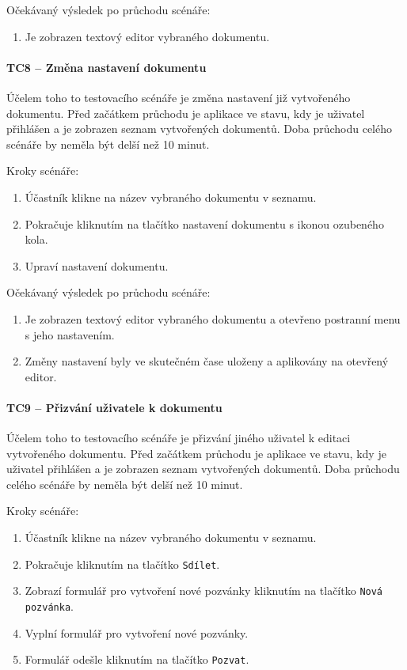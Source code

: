 Očekávaný výsledek po průchodu scénáře:
\begin{enumerate}
    \item Je zobrazen textový editor vybraného dokumentu.
\end{enumerate}

\paragraph{TC8 -- Změna nastavení dokumentu}

Účelem toho to testovacího scénáře je změna nastavení již vytvořeného dokumentu.
Před začátkem průchodu je aplikace ve stavu, kdy je uživatel přihlášen a je zobrazen seznam vytvořených dokumentů.
Doba průchodu celého scénáře by neměla být delší než 10 minut.

Kroky scénáře:
\begin{enumerate}
    \item Účastník klikne na název vybraného dokumentu v seznamu.
    \item Pokračuje kliknutím na tlačítko nastavení dokumentu s ikonou ozubeného kola.
    \item Upraví nastavení dokumentu.
\end{enumerate}

Očekávaný výsledek po průchodu scénáře:
\begin{enumerate}
    \item Je zobrazen textový editor vybraného dokumentu a otevřeno postranní menu s jeho nastavením.
    \item Změny nastavení byly ve skutečném čase uloženy a aplikovány na otevřený editor.
\end{enumerate}

\paragraph{TC9 -- Přizvání uživatele k dokumentu}

Účelem toho to testovacího scénáře je přizvání jiného uživatel k editaci vytvořeného dokumentu.
Před začátkem průchodu je aplikace ve stavu, kdy je uživatel přihlášen a je zobrazen seznam vytvořených dokumentů.
Doba průchodu celého scénáře by neměla být delší než 10 minut.

Kroky scénáře:
\begin{enumerate}
    \item Účastník klikne na název vybraného dokumentu v seznamu.
    \item Pokračuje kliknutím na tlačítko \texttt{Sdílet}.
    \item Zobrazí formulář pro vytvoření nové pozvánky kliknutím na tlačítko \texttt{Nová pozvánka}.
    \item Vyplní formulář pro vytvoření nové pozvánky.
    \item Formulář odešle kliknutím na tlačítko \texttt{Pozvat}.
\end{enumerate}

